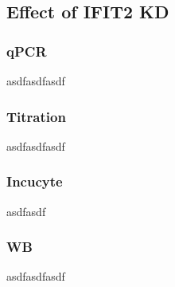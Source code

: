 \subsection{Effect of IFIT2 KD}
\subsubsection{qPCR}
asdfasdfasdf

\subsubsection{Titration}
asdfasdfasdf

\subsubsection{Incucyte}
asdfasdf

\subsubsection{WB}
asdfasdfasdf
